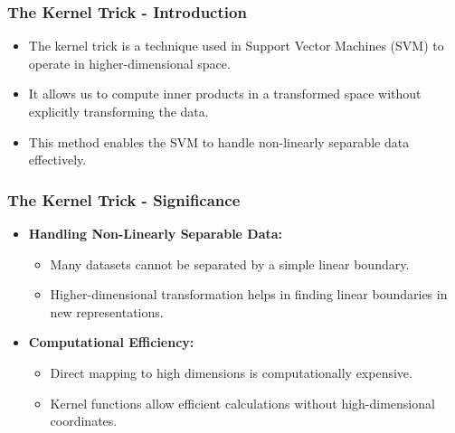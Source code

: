 \documentclass{beamer}
\begin{document}
\begin{frame}[fragile]
    \frametitle{The Kernel Trick - Introduction}
    \begin{itemize}
        \item The kernel trick is a technique used in Support Vector Machines (SVM) to operate in higher-dimensional space.
        \item It allows us to compute inner products in a transformed space without explicitly transforming the data.
        \item This method enables the SVM to handle non-linearly separable data effectively.
    \end{itemize}
\end{frame}

\begin{frame}[fragile]
    \frametitle{The Kernel Trick - Significance}
    \begin{itemize}
        \item \textbf{Handling Non-Linearly Separable Data:} 
            \begin{itemize}
                \item Many datasets cannot be separated by a simple linear boundary.
                \item Higher-dimensional transformation helps in finding linear boundaries in new representations.
            \end{itemize}

        \item \textbf{Computational Efficiency:} 
            \begin{itemize}
                \item Direct mapping to high dimensions is computationally expensive.
                \item Kernel functions allow efficient calculations without high-dimensional coordinates.
            \end{itemize}
    \end{itemize}
\end{frame}
\end{document}
